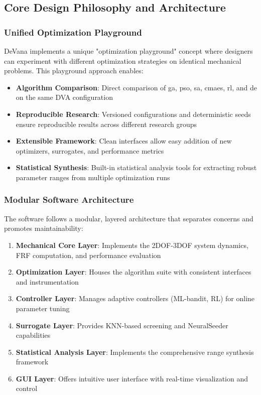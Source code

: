 \documentclass[12pt,a4paper]{article}
\newcommand{\softwareName}{DeVana}
\begin{document}
\subsection{Core Design Philosophy and Architecture}

\subsubsection{Unified Optimization Playground}

\softwareName{} implements a unique "optimization playground" concept where designers can experiment with different optimization strategies on identical mechanical problems. This playground approach enables:

\begin{itemize}
    \item \textbf{Algorithm Comparison}: Direct comparison of \gls{ga}, \gls{pso}, \gls{sa}, \gls{cmaes}, \gls{rl}, and \gls{de} on the same DVA configuration
    \item \textbf{Reproducible Research}: Versioned configurations and deterministic seeds ensure reproducible results across different research groups
    \item \textbf{Extensible Framework}: Clean interfaces allow easy addition of new optimizers, surrogates, and performance metrics
    \item \textbf{Statistical Synthesis}: Built-in statistical analysis tools for extracting robust parameter ranges from multiple optimization runs
\end{itemize}

\subsubsection{Modular Software Architecture}

The software follows a modular, layered architecture that separates concerns and promotes maintainability:

\begin{enumerate}
    \item \textbf{Mechanical Core Layer}: Implements the 2DOF-3DOF system dynamics, FRF computation, and performance evaluation
    \item \textbf{Optimization Layer}: Houses the algorithm suite with consistent interfaces and instrumentation
    \item \textbf{Controller Layer}: Manages adaptive controllers (ML-bandit, RL) for online parameter tuning
    \item \textbf{Surrogate Layer}: Provides KNN-based screening and NeuralSeeder capabilities
    \item \textbf{Statistical Analysis Layer}: Implements the comprehensive range synthesis framework
    \item \textbf{GUI Layer}: Offers intuitive user interface with real-time visualization and control
\end{enumerate}
\end{document}
